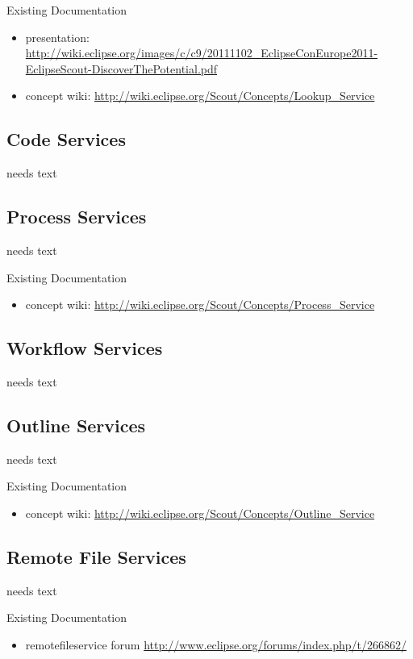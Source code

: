 \documentclass[a4paper,10pt,twoside]{book}
\begin{document}
\noindent Existing Documentation
\begin{itemize}
  \item presentation: \url{http://wiki.eclipse.org/images/c/c9/20111102_EclipseConEurope2011-EclipseScout-DiscoverThePotential.pdf}
  \item concept wiki: \url{http://wiki.eclipse.org/Scout/Concepts/Lookup_Service}
\end{itemize}

\subsection{Code Services}
needs text

\subsection{Process Services}
needs text

\noindent Existing Documentation
\begin{itemize}
  \item concept wiki: \url{http://wiki.eclipse.org/Scout/Concepts/Process_Service}
\end{itemize}

\subsection{Workflow Services}
needs text

\subsection{Outline Services}
needs text

\noindent Existing Documentation
\begin{itemize}
  \item concept wiki: \url{http://wiki.eclipse.org/Scout/Concepts/Outline_Service}
\end{itemize}

\subsection{Remote File Services}
needs text

\noindent Existing Documentation
\begin{itemize}
  \item remotefileservice forum \url{http://www.eclipse.org/forums/index.php/t/266862/}
\end{itemize}
\end{document}
